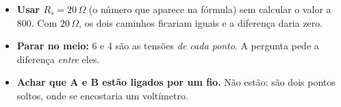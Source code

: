\begin{pegadinha}
\begin{itemize}
  \item \textbf{Usar $R_s = 20\,\Omega$} (o número que aparece na fórmula) sem calcular o valor a 800. Com $20\,\Omega$,
        os dois caminhos ficariam iguais e a diferença daria zero.
  \item \textbf{Parar no meio:} 6 e 4 são as tensões \emph{de cada ponto}. A pergunta pede a diferença \emph{entre} eles.
  \item \textbf{Achar que A e B estão ligados por um fio.} Não estão: são dois pontos soltos, onde se encostaria um voltímetro.
\end{itemize}
\end{pegadinha}
